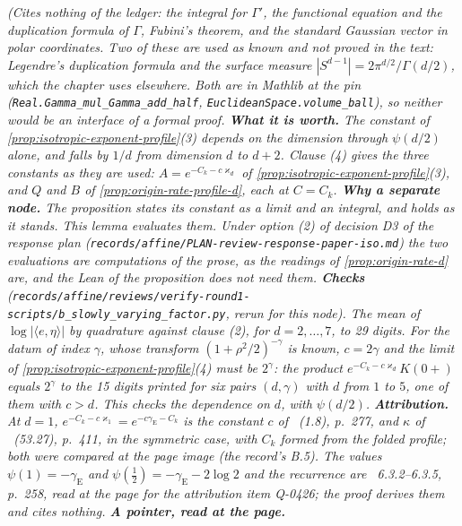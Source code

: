 \begin{lemma}
\statusT\quad\emph{(Cites nothing of the ledger: the integral for $\Gamma'$, the functional
equation and the duplication formula of $\Gamma$, Fubini's theorem, and the standard Gaussian
vector in polar coordinates. Two of these are used as known and not proved in the text:
Legendre's duplication formula and the surface measure
$|S^{d-1}| = 2\pi^{d/2}/\Gamma(d/2)$, which the chapter uses elsewhere. Both are in Mathlib at
the pin (\texttt{Real.Gamma\_mul\_Gamma\_add\_half}, \texttt{EuclideanSpace.volume\_ball}), so
neither would be an interface of a formal proof. \textbf{What it is worth.} The constant of
\ref{prop:isotropic-exponent-profile}(3)
depends on the dimension through $\psi(d/2)$ alone, and falls by $1/d$ from dimension $d$ to
$d + 2$. Clause (4) gives the three constants as they are used: $A = e^{-C_k - c\varkappa_d}$ of
\ref{prop:isotropic-exponent-profile}(3), and $Q$ and $B$ of
\ref{prop:origin-rate-profile-d}, each at $C = C_k$. \textbf{Why a separate node.} The proposition
states its constant as a limit and an integral, and holds as it stands. This lemma evaluates
them. Under option (2) of decision D3 of the response plan
(\texttt{records/affine/PLAN-review-response-paper-iso.md}) the two evaluations are computations
of the prose, as the \Matern{} readings of \ref{prop:origin-rate-d} are, and the Lean of the
proposition does not need them. \textbf{Checks}
(\texttt{records/affine/reviews/verify-round1-scripts/b\_slowly\_varying\_factor.py}, rerun for
this node). The mean of $\log|\langle e,\eta\rangle|$ by quadrature against clause (2), for
$d = 2,\dots,7$, to 29 digits. For the \Matern{} datum of index $\gamma$, whose transform
$(1 + \rho^2/2)^{-\gamma}$ is known, $c = 2\gamma$ and the limit of
\ref{prop:isotropic-exponent-profile}(4) must be $2^{\gamma}$: the product
$e^{-C_k - c\varkappa_d}K(0{+})$ equals $2^{\gamma}$ to the 15 digits printed for six pairs $(d,\gamma)$ with
$d$ from $1$ to $5$, one of them with $c > d$. This checks the dependence on $d$, with
$\psi(d/2)$. \textbf{Attribution.} At $d = 1$,
$e^{-C_k - c\varkappa_1} = e^{-c\gamma_{\mathrm E} - C_k}$ is the constant $c$ of
~(1.8), p.~277, and $\kappa$ of ~(53.27),
p.~411, in the symmetric case, with $C_k$ formed from the folded profile; both were compared at
the page image (the record's B.5). The values $\psi(1) = -\gamma_{\mathrm E}$ and
$\psi(\tfrac12) = -\gamma_{\mathrm E} - 2\log 2$ and the recurrence are
~6.3.2--6.3.5, p.~258, read at the page for the attribution item
Q-0426; the proof derives them and cites nothing. \textbf{A pointer, read at the page.}
}
\end{lemma}
